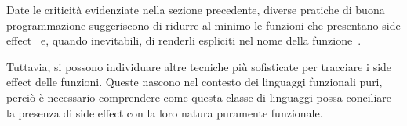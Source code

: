 Date le criticità evidenziate nella sezione precedente, diverse pratiche di buona programmazione suggeriscono di ridurre al minimo le funzioni che presentano side effect~\cite[p.~44]{cit:clean-code-a-handbook-of-agile-software-craftsmanship} e, quando inevitabili, di renderli espliciti nel nome della funzione~\cite[p.~313]{cit:clean-code-a-handbook-of-agile-software-craftsmanship}.

Tuttavia, si possono individuare altre tecniche più sofisticate per tracciare i side effect delle funzioni.
Queste nascono nel contesto dei linguaggi funzionali puri, perciò è necessario comprendere come questa classe di linguaggi possa conciliare la presenza di side effect con la loro natura puramente funzionale.
